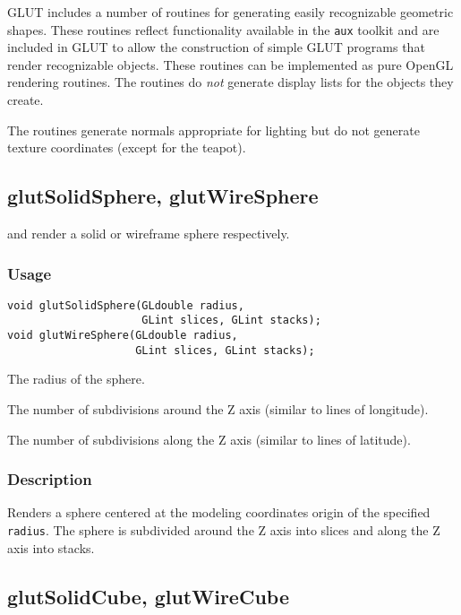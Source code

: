GLUT includes a number of routines for generating easily recognizable geometric
shapes.  These routines reflect functionality available in the {\tt aux} toolkit
and are included in GLUT to allow the construction of simple GLUT programs that
render recognizable objects.  These routines can be implemented as pure OpenGL
rendering routines.
The routines do {\em not} generate display lists for the objects they create.

The routines generate normals appropriate for lighting but do not generate
texture coordinates (except for the teapot).

\subsection{glutSolidSphere, glutWireSphere}

 and  render a solid or wireframe
sphere respectively.

\subsubsection*{Usage}
\begin{verbatim}
void glutSolidSphere(GLdouble radius,
                     GLint slices, GLint stacks);
void glutWireSphere(GLdouble radius,
                    GLint slices, GLint stacks);
\end{verbatim}
\begin{description}
\itemsep 0in
\item[\tt radius]
The radius of the sphere.
\item[\tt slices]
The number of subdivisions around the Z axis (similar to lines of longitude).
\item[\tt stacks]
The number of subdivisions along the Z axis (similar to lines of latitude).
\end{description}

\subsubsection*{Description}

Renders a sphere centered at the modeling coordinates origin of the specified {\tt radius}.
The sphere is subdivided around the Z axis into slices and along the Z
axis into stacks.

\subsection{glutSolidCube, glutWireCube}

